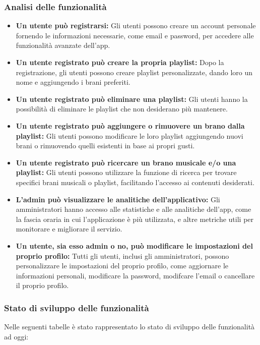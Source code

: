 \documentclass{article}
\begin{document}
			\subsubsection{Analisi delle funzionalità}
			\begin{itemize}
				\item \textbf{Un utente può registrarsi:} Gli utenti possono creare un account personale fornendo le informazioni necessarie, come email e password, per accedere alle funzionalità avanzate dell'app.
				\item \textbf{Un utente registrato può creare la propria playlist:} Dopo la registrazione, gli utenti possono creare playlist personalizzate, dando loro un nome e aggiungendo i brani preferiti.
				\item \textbf{Un utente registrato può eliminare una playlist:} Gli utenti hanno la possibilità di eliminare le playlist che non desiderano più mantenere.
				\item \textbf{Un utente registrato può aggiungere o rimuovere un brano dalla playlist:} Gli utenti possono modificare le loro playlist aggiungendo nuovi brani o rimuovendo quelli esistenti in base ai propri gusti.
				\item \textbf{Un utente registrato può ricercare un brano musicale e/o una playlist:} Gli utenti possono utilizzare la funzione di ricerca per trovare specifici brani musicali o playlist, facilitando l'accesso ai contenuti desiderati.
				\item \textbf{L'admin può visualizzare le analitiche dell'applicativo:} Gli amministratori hanno accesso alle statistiche e alle analitiche dell'app, come la fascia oraria in cui l'applicazione è più utilizzata, e altre metriche utili per monitorare e migliorare il servizio.
				\item \textbf{Un utente, sia esso admin o no, può modificare le impostazioni del proprio profilo:} Tutti gli utenti, inclusi gli amministratori, possono personalizzare le impostazioni del proprio profilo, come aggiornare le informazioni personali, modificare la password, modifcare l'email o cancellare il proprio profilo.
			\end{itemize}
			\subsubsection{Stato di sviluppo delle funzionalità}
			Nelle seguenti tabelle è stato rappresentato lo stato di sviluppo delle funzionalità ad oggi:
			
\end{document}
